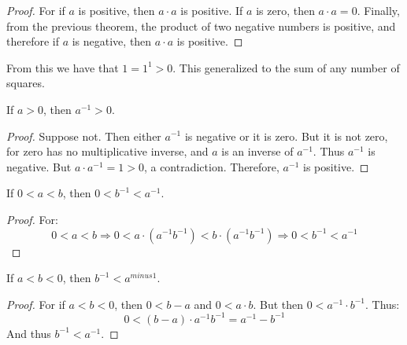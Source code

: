             \begin{proof}
                For if $a$ is positive, then $a\cdot{a}$ is positive.
                If $a$ is zero, then $a\cdot{a}=0$. Finally, from the
                previous theorem, the product of two negative numbers
                is positive, and therefore if $a$ is negative, then
                $a\cdot{a}$ is positive.
            \end{proof}
            From this we have that $1=1^{1}>0$. This generalized to
            the sum of any number of squares.
            \begin{theorem}
                If $a>0$, then $a^{\minus{1}}>0$.
            \end{theorem}
            \begin{proof}
                Suppose not. Then either $a^{\minus{1}}$ is negative
                or it is zero. But it is not zero, for zero has no
                multiplicative inverse, and $a$ is an inverse of
                $a^{\minus{1}}$. Thus $a^{\minus{1}}$ is negative.
                But $a\cdot{a}^{\minus{1}}=1>0$, a contradiction.
                Therefore, $a^{\minus{1}}$ is positive.
            \end{proof}
            \begin{theorem}
                If $0<a<b$, then $0<b^{\minus{1}}<a^{\minus{1}}$.
            \end{theorem}
            \begin{proof}
                For:
                \begin{equation}
                    0<a<b\Longrightarrow
                    0<a\cdot(a^{\minus{1}}b^{\minus{1}})<
                    b\cdot(a^{\minus{1}}b^{\minus{1}})
                    \Longrightarrow
                    0<b^{\minus{1}}<a^{\minus{1}}
                \end{equation}
            \end{proof}
            \begin{theorem}
                If $a<b<0$, then $b^{\minus{1}}<a^{minus{1}}$.
            \end{theorem}
            \begin{proof}
                For if $a<b<0$, then $0<b-a$ and
                $0<a\cdot{b}$. But then
                $0<a^{\minus{1}}\cdot{b}^{\minus{1}}$.
                Thus:
                \begin{equation}
                    0<(b-a)\cdot{a}^{\minus{1}}b^{\minus{1}}=
                    a^{\minus{1}}-b^{\minus{1}}
                \end{equation}
                And thus $b^{\minus{1}}<a^{\minus{1}}$.
            \end{proof}

